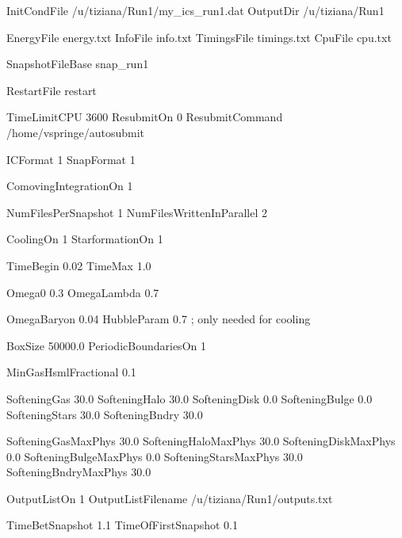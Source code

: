 
InitCondFile  		/u/tiziana/Run1/my_ics_run1.dat
OutputDir               /u/tiziana/Run1

EnergyFile        energy.txt
InfoFile          info.txt
TimingsFile       timings.txt
CpuFile           cpu.txt

SnapshotFileBase  snap_run1

RestartFile       restart




TimeLimitCPU      3600
ResubmitOn        0
ResubmitCommand   /home/vspringe/autosubmit



ICFormat              1
SnapFormat            1

ComovingIntegrationOn 1

NumFilesPerSnapshot       1
NumFilesWrittenInParallel 2

CoolingOn       1
StarformationOn 1
 

TimeBegin           0.02    %
TimeMax	            1.0     %

Omega0	              0.3   %
OmegaLambda           0.7

OmegaBaryon           0.04
HubbleParam           0.7     ; only needed for cooling

BoxSize                50000.0
PeriodicBoundariesOn   1



MinGasHsmlFractional     0.1  %

SofteningGas       30.0  
SofteningHalo      30.0   
SofteningDisk      0.0
SofteningBulge     0.0           
SofteningStars     30.0
SofteningBndry     30.0         %

SofteningGasMaxPhys       30.0
SofteningHaloMaxPhys      30.0
SofteningDiskMaxPhys      0.0
SofteningBulgeMaxPhys     0.0           
SofteningStarsMaxPhys     30.0
SofteningBndryMaxPhys     30.0    




OutputListOn        1
OutputListFilename  /u/tiziana/Run1/outputs.txt

TimeBetSnapshot        1.1
TimeOfFirstSnapshot    0.1
 
